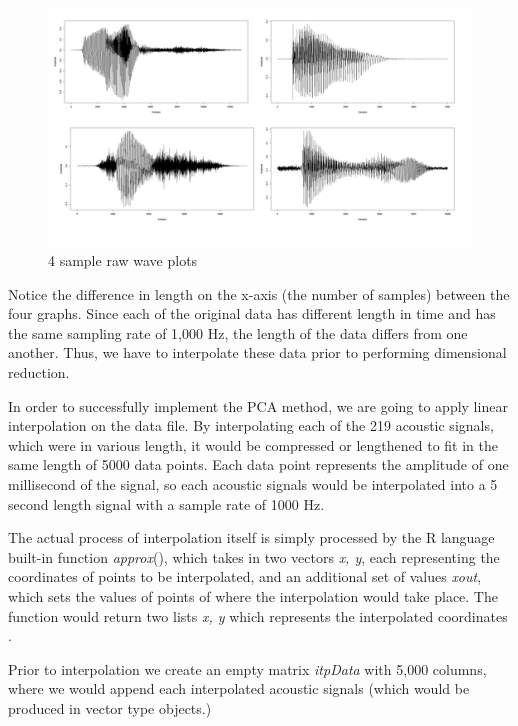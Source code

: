 \begin{figure}[H]
    \centering
    \includegraphics[width=15cm]{images/Interpolation/4 plot image.png}
    \caption{4 sample raw wave plots}
    \label{fig:4plot} 
\end{figure}

Notice the difference in length on the x-axis (the number of samples) between the four graphs. Since each of the original data has different length in time and has the same sampling rate of 1,000 Hz, the length of the data differs from one another. Thus, we have to interpolate these data prior to performing dimensional reduction.

In order to successfully implement the PCA method, we are going to apply linear interpolation on the data file. By interpolating each of the 219 acoustic signals, which were in various length, it would be compressed or lengthened to fit in the same length of 5000 data points. Each data point represents the amplitude of one millisecond of the signal, so each acoustic signals would be interpolated into a 5 second length signal with a sample rate of 1000 Hz.

The actual process of interpolation itself is simply processed by the R language built-in function \emph{approx}(), which takes in two vectors \emph{x, y}, each representing the coordinates of points to be interpolated, and an additional set of values \emph{xout}, which sets the values of points of where the interpolation would take place. The function would return two lists \emph{x, y} which represents the interpolated coordinates \cite{Approx}.

Prior to interpolation we create an empty matrix \emph{itpData} with 5,000 columns, where we would append each interpolated acoustic signals (which would be produced in vector type objects.)

